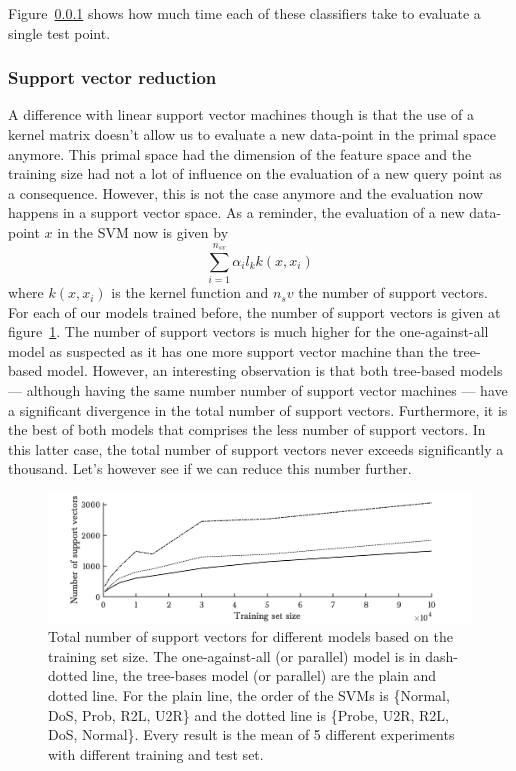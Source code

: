 Figure~\ref{} shows how much time each of these classifiers take to evaluate a single test point. 

\FloatBarrier
\subsubsection{Support vector reduction}
A difference with linear support vector machines though is that the use of a kernel matrix doesn't allow us to evaluate a new data-point in the primal space anymore. This primal space had the dimension of the feature space and the training size had not a lot of influence on the evaluation of a new query point as a consequence. However, this is not the case anymore and the evaluation now happens in a support vector space. As a reminder, the evaluation of a new data-point $x$ in the SVM now is given by
\begin{equation}
    \sum_{i=1}^{n_{sv}} \alpha_i l_k k(x,x_i)
\end{equation}
where $k(x,x_i)$ is the kernel function and $n_sv$ the number of support vectors. For each of our models trained before, the number of support vectors is given at figure~\ref{fig:svm-nl-sv}. The number of support vectors is much higher for the one-against-all model as suspected as it has one more support vector machine than the tree-based model. However, an interesting observation is that both tree-based models --- although having the same number number of support vector machines --- have a significant divergence in the total number of support vectors. Furthermore, it is the best of both models that comprises the less number of support vectors. In this latter case, the total number of support vectors never exceeds significantly a thousand. Let's however see if we can reduce this number further.

\begin{figure}[ht!]
    \centering
    \includegraphics[width=1\textwidth]{parts/chap-4/img-svm/svm-nl-sv.png}
    \caption{Total number of support vectors for different models based on the training set size. The one-against-all (or parallel) model is in dash-dotted line, the tree-bases model (or parallel) are the plain and dotted line. For the plain line, the order of the SVMs is \{Normal, DoS, Prob, R2L, U2R\} and the dotted line is \{Probe, U2R, R2L, DoS, Normal\}. Every result is the mean of 5 different experiments with different training and test set.}
    \label{fig:svm-nl-sv}
\end{figure}

